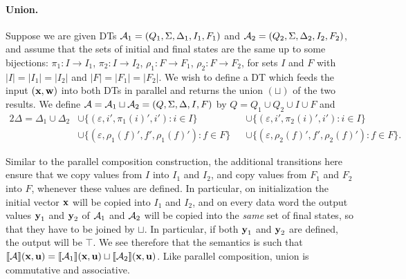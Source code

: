 \paragraph*{Union.}
Suppose we are given DTs $\mathcal{A}_1 = (Q_{1}, \Sigma, \Delta_{1}, I_{1}, F_{1})$ and $\mathcal{A}_2 = (Q_{2}, \Sigma, \Delta_{2}, I_{2}, F_{2})$, and assume that the sets of initial and final states are the same up to some bijections: $\pi_1: I \to I_1$, $\pi_2: I \to I_2$, $\rho_1: F \to F_1$, $\rho_2: F \to F_2$, for sets $I$ and $F$ with $|I| = |I_1| = |I_2|$ and $|F| = |F_1| = |F_2|$. We wish to define a DT which feeds the input $(\textbf{x},\textbf{w})$ into both DTs in parallel and returns the union $(\sqcup)$ of the two results.
We define $\mathcal{A} = \mathcal{A}_1 \sqcup \mathcal{A}_2 = (Q, \Sigma, \Delta, I, F){}$ by $Q = Q_1 \cup Q_2 \cup I \cup F$ and
\begin{alignat*}{2}
\Delta = \Delta_1 \cup \Delta_2
    &\cup \big\{(\varepsilon, i', \pi_1(i)', i') : i \in I \big\}
    &&\cup \big\{(\varepsilon, i', \pi_2(i)', i') : i \in I \big\} \\
    &\cup \big\{(\varepsilon, \rho_1(f)', f', \rho_1(f)') : f \in F \big\}
    &&\cup \big\{(\varepsilon, \rho_2(f)', f', \rho_2(f)') : f \in F \big\}.
\end{alignat*}

Similar to the parallel composition construction, the additional transitions here ensure that we copy values from $I$ into $I_1$ and $I_2$, and copy values from $F_1$ and $F_2$ into $F$, whenever these values are defined. In particular, on initialization the initial vector $\textbf{x}$ will be copied into $I_1$ and $I_2$, and on every data word the output values $\textbf{y}_1$ and $\textbf{y}_2$ of $\mathcal{A}_1$ and $\mathcal{A}_2$ will be copied into the \emph{same} set of final states, so that they have to be joined by $\sqcup$. In particular, if both $\textbf{y}_1$ and $\textbf{y}_2$ are defined, the output will be $\top$. We see therefore that the semantics is such that $\llbracket \mathcal{A} \rrbracket(\textbf{x},\textbf{u}) = \llbracket \mathcal{A}_1 \rrbracket(\textbf{x},\textbf{u}) \sqcup \llbracket \mathcal{A}_2 \rrbracket(\textbf{x},\textbf{u})$. Like parallel composition, union is commutative and associative.

\begin{figure*}[h]

\label{dt:fig:union}
\end{figure*}


